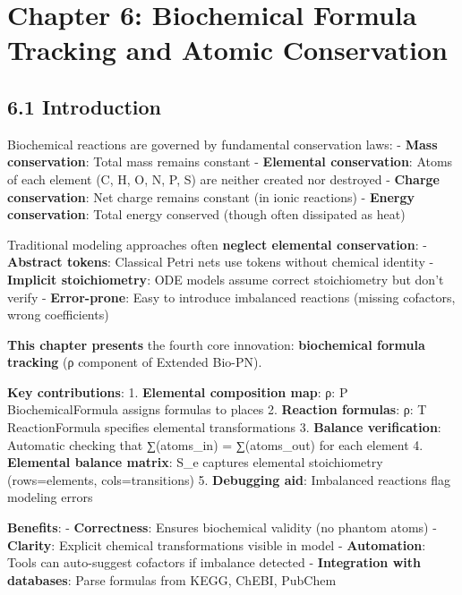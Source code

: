 \hypertarget{chapter-6-biochemical-formula-tracking-and-atomic-conservation}{%
\chapter{Chapter 6: Biochemical Formula Tracking and Atomic
Conservation}\label{chapter-6-biochemical-formula-tracking-and-atomic-conservation}}

\hypertarget{introduction}{%
\section{6.1 Introduction}\label{introduction}}

Biochemical reactions are governed by fundamental conservation laws: -
\textbf{Mass conservation}: Total mass remains constant -
\textbf{Elemental conservation}: Atoms of each element (C, H, O, N, P,
S) are neither created nor destroyed - \textbf{Charge conservation}: Net
charge remains constant (in ionic reactions) - \textbf{Energy
conservation}: Total energy conserved (though often dissipated as heat)

Traditional modeling approaches often \textbf{neglect elemental
conservation}: - \textbf{Abstract tokens}: Classical Petri nets use
tokens without chemical identity - \textbf{Implicit stoichiometry}: ODE
models assume correct stoichiometry but don't verify -
\textbf{Error-prone}: Easy to introduce imbalanced reactions (missing
cofactors, wrong coefficients)

\textbf{This chapter presents} the fourth core innovation:
\textbf{biochemical formula tracking} (ρ component of Extended Bio-PN).

\textbf{Key contributions}: 1. \textbf{Elemental composition map}: ρ: P
\textrightarrow BiochemicalFormula assigns formulas to places 2. \textbf{Reaction
formulas}: ρ: T \textrightarrow ReactionFormula specifies elemental transformations 3.
\textbf{Balance verification}: Automatic checking that ∑(atoms\_in) =
∑(atoms\_out) for each element 4. \textbf{Elemental balance matrix}:
S\_e captures elemental stoichiometry (rows=elements, cols=transitions)
5. \textbf{Debugging aid}: Imbalanced reactions flag modeling errors

\textbf{Benefits}: - \textbf{Correctness}: Ensures biochemical validity
(no phantom atoms) - \textbf{Clarity}: Explicit chemical transformations
visible in model - \textbf{Automation}: Tools can auto-suggest cofactors
if imbalance detected - \textbf{Integration with databases}: Parse
formulas from KEGG, ChEBI, PubChem

